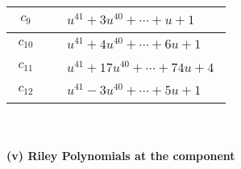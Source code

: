 \documentclass[1p]{elsarticle_modified}
\theoremstyle{definition}
\begin{document}
\begin{tabular}{m{50pt}|m{274pt}}
\hline $$\begin{aligned}c_{9}\end{aligned}$$&$\begin{aligned}
&u^{41}+3 u^{40}+\cdots+u+1
\end{aligned}$\\
\hline $$\begin{aligned}c_{10}\end{aligned}$$&$\begin{aligned}
&u^{41}+4 u^{40}+\cdots+6 u+1
\end{aligned}$\\
\hline $$\begin{aligned}c_{11}\end{aligned}$$&$\begin{aligned}
&u^{41}+17 u^{40}+\cdots+74 u+4
\end{aligned}$\\
\hline $$\begin{aligned}c_{12}\end{aligned}$$&$\begin{aligned}
&u^{41}-3 u^{40}+\cdots+5 u+1
\end{aligned}$\\
\hline
\end{tabular}\\~\\
\newpage\renewcommand{\arraystretch}{1}
\flushleft \textbf{(v) Riley Polynomials at the component}\newline \\
\end{document}
